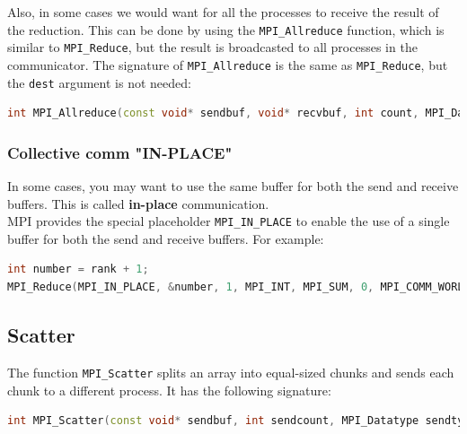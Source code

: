 Also, in some cases we would want for all the processes to receive the result of the reduction.
This can be done by using the \texttt{MPI\_Allreduce} function, which is similar to \texttt{MPI\_Reduce},
but the result is broadcasted to all processes in the communicator. The signature of \texttt{MPI\_Allreduce}
is the same as \texttt{MPI\_Reduce}, but the \texttt{dest} argument is not needed:

\begin{lstlisting}[language=C++]
int MPI_Allreduce(const void* sendbuf, void* recvbuf, int count, MPI_Datatype datatype, MPI_Op op, MPI_Comm comm);
\end{lstlisting}

\subsubsection{Collective comm "IN-PLACE"}

In some cases, you may want to use the same buffer for both the send and receive buffers. This
is called \textbf{in-place} communication.\\

MPI provides the special placeholder \texttt{MPI\_IN\_PLACE} to enable the use of a 
single buffer for both the send and receive buffers. For example:

\begin{lstlisting}[language=C++]
int number = rank + 1;
MPI_Reduce(MPI_IN_PLACE, &number, 1, MPI_INT, MPI_SUM, 0, MPI_COMM_WORLD);
\end{lstlisting}

\subsection{Scatter}

The function \texttt{MPI\_Scatter} splits an array into equal-sized chunks and sends each chunk
to a different process. It has the following signature:

\begin{lstlisting}[language=C++]
int MPI_Scatter(const void* sendbuf, int sendcount, MPI_Datatype sendtype, void* recvbuf, int recvcount, MPI_Datatype recvtype, int root, MPI_Comm comm);
\end{lstlisting}

